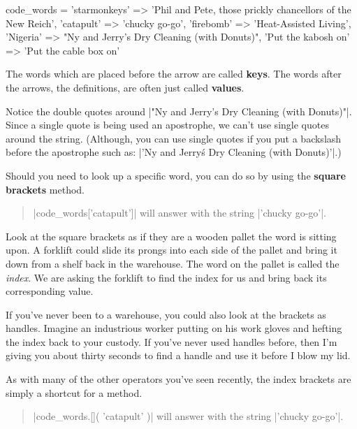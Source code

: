 \documentclass[12pt,twoside]{report}
\begin{document}
\begin{rubycode}

 code_words = {
   'starmonkeys' => 'Phil and Pete, those prickly chancellors of the New Reich',
   'catapult' => 'chucky go-go', 'firebomb' => 'Heat-Assisted Living',
   'Nigeria' => "Ny and Jerry's Dry Cleaning (with Donuts)",
   'Put the kabosh on' => 'Put the cable box on'
 }

\end{rubycode}

The words which are placed before the arrow are called {\bf keys}.
The words after the arrows, the definitions, are often just called
{\bf values}.

Notice the double quotes around \rubyinline|"Ny and Jerry's Dry Cleaning (with Donuts)"|.
Since a single quote is being used an apostrophe, we can't use single
quotes around the string.  (Although, you can use single quotes if you
put a backslash before the apostrophe such as:
\rubyinline|'Ny and Jerry\'s Dry Cleaning (with Donuts)'|.)

Should you need to look up a specific word, you can do so by using the
{\bf square brackets} method.

\begin{quote}
\rubyinline|code_words['catapult']| will answer with
the string \rubyinline|'chucky go-go'|.\end{quote}


Look at the square brackets as if they are a wooden pallet the word is
sitting upon. A forklift could slide its prongs into each side of the
pallet and bring it down from a shelf back in the warehouse.  The word
on the pallet is called the {\em index}. We are asking the forklift to
find the index for us and bring back its corresponding value.

If you've never been to a warehouse, you could also look at the
brackets as handles. Imagine an industrious worker putting on his work
gloves and hefting the index back to your custody.  If you've never
used handles before, then I'm giving you about thirty seconds to find
a handle and use it before I blow my lid.

As with many of the other operators you've seen recently, the index
brackets are simply a shortcut for a method.

\begin{quote}
\rubyinline|code_words.[]( 'catapult' )| will answer
with the string \rubyinline|'chucky go-go'|.\end{quote}
\end{document}

